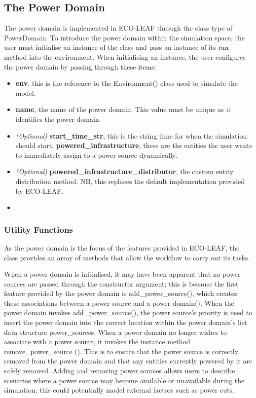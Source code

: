 \documentclass{l4proj}
\begin{document}
\subsection{The Power Domain}\label{sec:power-domain}
The power domain is implemented in ECO-LEAF through the class type of PowerDomain.
To introduce the power domain within the simulation space, the user must initialise an instance of the class and pass an instance of its run method into the environment.
When initialising an instance, the user configures the power domain by passing through these items:
\begin{itemize}
    \item \textbf{env}, this is the reference to the Environment() class used to simulate the model.
    \item \textbf{name}, the name of the power domain. This value must be unique as it identifies the power domain.
    \item \textit{(Optional)} \textbf{start\_time\_str}, this is the string time for when the simulation should start. \textbf{powered\_infrastructure}, these are the entities the user wants to immediately assign to a power source dynamically.
    \item \textit{(Optional)} \textbf{powered\_infrastructure\_distributor}, the custom entity distribution method. NB, this replaces the default implementation provided by ECO-LEAF.
\item \end{itemize}

\subsubsection{Utility Functions}\label{imp:subsec:utility}
As the power domain is the focus of the features provided in ECO-LEAF, the class provides an array of methods that allow the workflow to carry out its tasks.

When a power domain is initialised, it may have been apparent that no power sources are passed through the constructor argument;
this is because the first feature provided by the power domain is add\_power\_source(), which creates these associations between a power source and a power domain().
When the power domain invokes add\_power\_source(), the power source's priority is used to insert the power domain into the correct location within the power domain's list data structure power\_sources.
When a power domain no longer wishes to associate with a power source, it invokes the instance method remove\_power\_source ().
This is to ensure that the power source is correctly removed from the power domain and that any entities currently powered by it are safely removed.
Adding and removing power sources allows users to describe scenarios where a power source may become available or unavailable during the simulation;
this could potentially model external factors such as power cuts.
\end{document}
